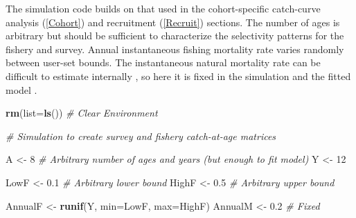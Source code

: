 \documentclass[
]{krantz}
\makeatletter
\newenvironment{Shaded}{\begin{snugshade}}{\end{snugshade}}
\newcommand{\AttributeTok}[1]{\textcolor[rgb]{0.27,0.27,0.27}{#1}}
\newcommand{\CommentTok}[1]{\textcolor[rgb]{0.37,0.37,0.37}{\textit{#1}}}
\newcommand{\DecValTok}[1]{\textcolor[rgb]{0.06,0.06,0.06}{#1}}
\newcommand{\FloatTok}[1]{\textcolor[rgb]{0.06,0.06,0.06}{#1}}
\newcommand{\FunctionTok}[1]{\textcolor[rgb]{0.27,0.27,0.27}{\textbf{#1}}}
\newcommand{\NormalTok}[1]{#1}
\newcommand{\OtherTok}[1]{\textcolor[rgb]{0.37,0.37,0.37}{#1}}
\newenvironment{kframe}{%
\medskip{}
\setlength{\fboxsep}{.8em}
 \def\at@end@of@kframe{}%
 \ifinner\ifhmode%
  \def\at@end@of@kframe{\end{minipage}}%
  \begin{minipage}{\columnwidth}%
 \fi\fi%
 \def\FrameCommand##1{\hskip\@totalleftmargin \hskip-\fboxsep
 \colorbox{shadecolor}{##1}\hskip-\fboxsep
     \hskip-\linewidth \hskip-\@totalleftmargin \hskip\columnwidth}%
 \MakeFramed {\advance\hsize-\width
   \@totalleftmargin\z@ \linewidth\hsize
   \@setminipage}}%
 {\par\unskip\endMakeFramed%
 \at@end@of@kframe}
\renewenvironment{Shaded}{\begin{kframe}}{\end{kframe}}
\makeatother
\begin{document}
The simulation code builds on that used in the cohort-specific catch-curve analysis (\ref{Cohort}) and recruitment (\ref{Recruit}) sections. The number of ages is arbitrary but should be sufficient to characterize the selectivity patterns for the fishery and survey. Annual instantaneous fishing mortality rate varies randomly between user-set bounds. The instantaneous natural mortality rate can be difficult to estimate internally \citep{quinn.deriso_1999, schaub.etal_2024}, so here it is fixed in the simulation and the fitted model \citep[e.g., using external information such as longevity:][]{lorenzen1996, then.etal_2015}.

\begin{Shaded}
\begin{Highlighting}[]
\FunctionTok{rm}\NormalTok{(}\AttributeTok{list=}\FunctionTok{ls}\NormalTok{()) }\CommentTok{\# Clear Environment}

\CommentTok{\# Simulation to create survey and fishery catch{-}at{-}age matrices}

\NormalTok{A }\OtherTok{\textless{}{-}} \DecValTok{8} \CommentTok{\# Arbitrary number of ages and years (but enough to fit model)}
\NormalTok{Y }\OtherTok{\textless{}{-}} \DecValTok{12}

\NormalTok{LowF }\OtherTok{\textless{}{-}} \FloatTok{0.1} \CommentTok{\# Arbitrary lower bound}
\NormalTok{HighF }\OtherTok{\textless{}{-}} \FloatTok{0.5} \CommentTok{\# Arbitrary upper bound}

\NormalTok{AnnualF }\OtherTok{\textless{}{-}} \FunctionTok{runif}\NormalTok{(Y, }\AttributeTok{min=}\NormalTok{LowF, }\AttributeTok{max=}\NormalTok{HighF)}
\NormalTok{AnnualM }\OtherTok{\textless{}{-}} \FloatTok{0.2} \CommentTok{\# Fixed}


\end{Highlighting}
\end{Shaded}
\end{document}

